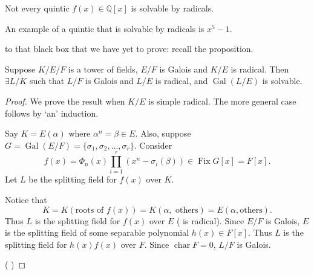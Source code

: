 \documentclass[notoc,notitlepage,nobib]{tufte-book}
\DeclareMathOperator{\Gal}{Gal}
\DeclareMathOperator{\Fix}{Fix}
\DeclareMathOperator{\Char}{char}
\begin{document}
\begin{thm}\label{thm:insolvability_of_the_quintics}
  Not every quintic $f(x) \in \mathbb{Q}[x]$ is solvable by radicals.
\end{thm}

\begin{eg}
  An example of a quintic that is solvable by radicals is $x^5 - 1$.
\end{eg}

 to that black box that we have yet to prove: recall the
proposition.

\begin{propo}
  Suppose $K / E / F$ is a tower of fields, $E / F$ is Galois and $K / E$ is
  radical. Then $\exists L / K$ such that $L / F$ is Galois and $L / E$ is
  radical, and $\Gal(L / E)$ is solvable.
\end{propo}

\begin{proof}
  We prove the result when $K / E$ is simple radical. The more general case
  follows by `an'  induction.

  Say $K = E(\alpha)$ where $\alpha^n = \beta \in E$. Also, suppose $G = \Gal(E
  / F) = \{ \sigma_1, \sigma_2, ..., \sigma_r \}$. Consider 
  \begin{equation*}
    f(x) = \Phi_n(x) \prod_{i=1}^{r} (x^n - \sigma_i(\beta)) \in \Fix G[x] = F[x].
  \end{equation*}
  Let $L$ be the splitting field for $f(x)$ over $K$.

  \noindent
   Notice that
  \begin{equation*}
    K = K(\text{roots of } f(x)) = K(\alpha, \text{ others}) = E(\alpha, \text{
    others}).
  \end{equation*}
  Thus $L$ is the splitting field for $f(x)$ over $E$ ( is
  radical). Since $E / F$ is Galois, $E$ is the splitting field of some
  separable polynomial $h(x) \in F[x]$. Thus $L$ is the splitting field for
  $h(x) f(x)$ over $F$. Since $\Char F = 0$, $L / F$ is Galois.

  ( )
\end{proof}

\end{document}
